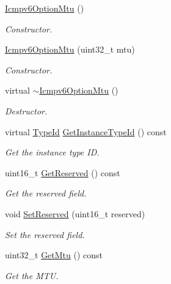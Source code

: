 \begin{DoxyCompactItemize}
\item 
\hyperlink{classns3_1_1Icmpv6OptionMtu_acd9747949244bb0c5a5f7d00e1c7f143}{Icmpv6\+Option\+Mtu} ()
\begin{DoxyCompactList}\small\item\em Constructor. \end{DoxyCompactList}\item 
\hyperlink{classns3_1_1Icmpv6OptionMtu_a1f99c575ea005b75c9c4a594fa87ce68}{Icmpv6\+Option\+Mtu} (uint32\+\_\+t mtu)
\begin{DoxyCompactList}\small\item\em Constructor. \end{DoxyCompactList}\item 
virtual \hyperlink{classns3_1_1Icmpv6OptionMtu_a841fcc132e24f228bf1f26703a3b17e4}{$\sim$\+Icmpv6\+Option\+Mtu} ()
\begin{DoxyCompactList}\small\item\em Destructor. \end{DoxyCompactList}\item 
virtual \hyperlink{classns3_1_1TypeId}{Type\+Id} \hyperlink{classns3_1_1Icmpv6OptionMtu_a08bff0327430eaecec290d4422781ca6}{Get\+Instance\+Type\+Id} () const 
\begin{DoxyCompactList}\small\item\em Get the instance type ID. \end{DoxyCompactList}\item 
uint16\+\_\+t \hyperlink{classns3_1_1Icmpv6OptionMtu_a93c6bd256900ab59982a603659e5dfb3}{Get\+Reserved} () const 
\begin{DoxyCompactList}\small\item\em Get the reserved field. \end{DoxyCompactList}\item 
void \hyperlink{classns3_1_1Icmpv6OptionMtu_a3826120a052727bfe81888460db368ff}{Set\+Reserved} (uint16\+\_\+t reserved)
\begin{DoxyCompactList}\small\item\em Set the reserved field. \end{DoxyCompactList}\item 
uint32\+\_\+t \hyperlink{classns3_1_1Icmpv6OptionMtu_aedbd5b3ca5862f50da92618653b71f39}{Get\+Mtu} () const 
\begin{DoxyCompactList}\small\item\em Get the M\+TU. \end{DoxyCompactList}\item 

\end{DoxyCompactItemize}

